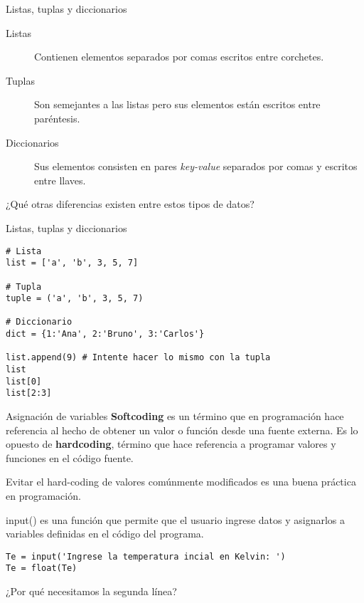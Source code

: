 \documentclass[10pt]{beamer}
\begin{document}
\begin{frame}[fragile]{Listas, tuplas y diccionarios}
	\begin{description}
		\item[Listas] Contienen elementos separados por comas escritos entre corchetes.
		\item[Tuplas] Son semejantes a las listas pero sus elementos están escritos entre paréntesis.
		\item[Diccionarios] Sus elementos consisten en pares \emph{key-value} separados por comas y escritos entre llaves.
	\end{description}

\vspace{1em}

\begin{center}
	¿Qué otras diferencias existen entre estos tipos de datos?
\end{center}
\end{frame}

\begin{frame}[fragile]{Listas, tuplas y diccionarios}
	\begin{verbatim}
# Lista 
list = ['a', 'b', 3, 5, 7]
	
# Tupla
tuple = ('a', 'b', 3, 5, 7) 

# Diccionario
dict = {1:'Ana', 2:'Bruno', 3:'Carlos'}

list.append(9) # Intente hacer lo mismo con la tupla
list 
list[0]
list[2:3]
	\end{verbatim}
\end{frame}

\begin{frame}[fragile]{Asignación de variables}
\textbf{Softcoding} es un término que en programación hace referencia al hecho de obtener un valor o función desde una fuente externa. Es lo opuesto de \textbf{hardcoding}, término que hace referencia a programar valores y funciones en el código fuente.

Evitar el hard-coding de valores comúnmente modificados es una buena práctica en programación.

\alert{input()} es una función que permite que el usuario ingrese datos y asignarlos a variables definidas en el código del programa.
	
	\begin{verbatim}
Te = input('Ingrese la temperatura incial en Kelvin: ')
Te = float(Te) 
	\end{verbatim}
	
	\begin{center}
		¿Por qué necesitamos la segunda línea?
	\end{center}
\end{frame}
\end{document}
